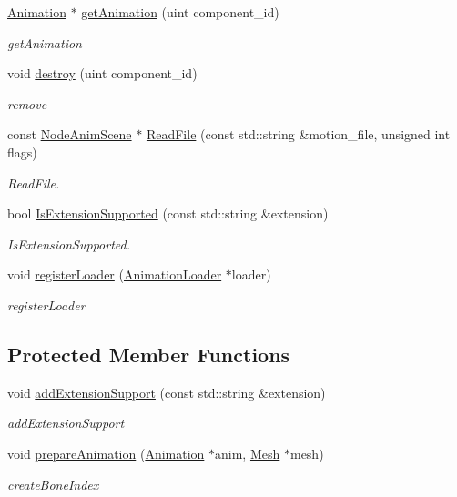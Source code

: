\begin{DoxyCompactItemize}
\item 
\hyperlink{classEngine_1_1Animation}{Animation} $\ast$ \hyperlink{classEngine_1_1AnimationManager_aa22f9a6d3b41f702da6c6c2ec5414acc}{get\+Animation} (uint component\+\_\+id)
\begin{DoxyCompactList}\small\item\em get\+Animation \end{DoxyCompactList}\item 
void \hyperlink{classEngine_1_1AnimationManager_ac5aa9b68314681e6b1cc449d259ee277}{destroy} (uint component\+\_\+id)
\begin{DoxyCompactList}\small\item\em remove \end{DoxyCompactList}\item 
const \hyperlink{classEngine_1_1NodeAnimScene}{Node\+Anim\+Scene} $\ast$ \hyperlink{classEngine_1_1AnimationManager_a0314d0b13a86da7ea893333dbb69d833}{Read\+File} (const std\+::string \&motion\+\_\+file, unsigned int flags)
\begin{DoxyCompactList}\small\item\em Read\+File. \end{DoxyCompactList}\item 
bool \hyperlink{classEngine_1_1AnimationManager_a3248d132cea1fdf69d96c2c7d1ffda08}{Is\+Extension\+Supported} (const std\+::string \&extension)
\begin{DoxyCompactList}\small\item\em Is\+Extension\+Supported. \end{DoxyCompactList}\item 
void \hyperlink{classEngine_1_1AnimationManager_a5d5c62435011bb70e8b344700e1a6829}{register\+Loader} (\hyperlink{classEngine_1_1AnimationLoader}{Animation\+Loader} $\ast$loader)
\begin{DoxyCompactList}\small\item\em register\+Loader \end{DoxyCompactList}\end{DoxyCompactItemize}
\subsection*{Protected Member Functions}
\begin{DoxyCompactItemize}
\item 
void \hyperlink{classEngine_1_1AnimationManager_a697b862a65f681654d92b5ea529fd9f4}{add\+Extension\+Support} (const std\+::string \&extension)
\begin{DoxyCompactList}\small\item\em add\+Extension\+Support \end{DoxyCompactList}\item 
void \hyperlink{classEngine_1_1AnimationManager_a5b150fa34470c4221baea6fc94ef2007}{prepare\+Animation} (\hyperlink{classEngine_1_1Animation}{Animation} $\ast$anim, \hyperlink{classEngine_1_1Mesh}{Mesh} $\ast$mesh)
\begin{DoxyCompactList}\small\item\em create\+Bone\+Index \end{DoxyCompactList}\end{DoxyCompactItemize}


